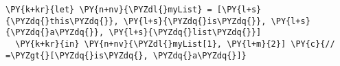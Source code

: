 \begin{Verbatim}[commandchars=\\\{\}]
\PY{k+kr}{let} \PY{n+nv}{\PYZdl{}myList} = [\PY{l+s}{\PYZdq{}this\PYZdq{}}, \PY{l+s}{\PYZdq{}is\PYZdq{}}, \PY{l+s}{\PYZdq{}a\PYZdq{}}, \PY{l+s}{\PYZdq{}list\PYZdq{}}]
  \PY{k+kr}{in} \PY{n+nv}{\PYZdl{}myList[1}, \PY{l+m}{2}] \PY{c}{// =\PYZgt{}[\PYZdq{}is\PYZdq{}, \PYZdq{}a\PYZdq{}]}
\end{Verbatim}
